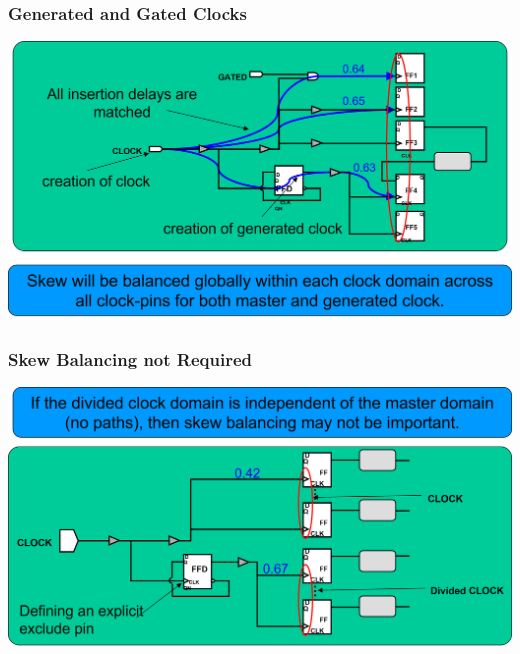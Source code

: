 \documentclass[compress]{beamer}
\begin{document}
\begin{frame}
	\frametitle{Generated and Gated Clocks}
	\begin{center}
		\includegraphics[width=\textwidth]{Generated}
	\end{center}
\end{frame}

\begin{frame}
	\frametitle{Skew Balancing not Required}
	\begin{center}
		\includegraphics[width=\textwidth]{Balancing}
	\end{center}
\end{frame}
\end{document}
